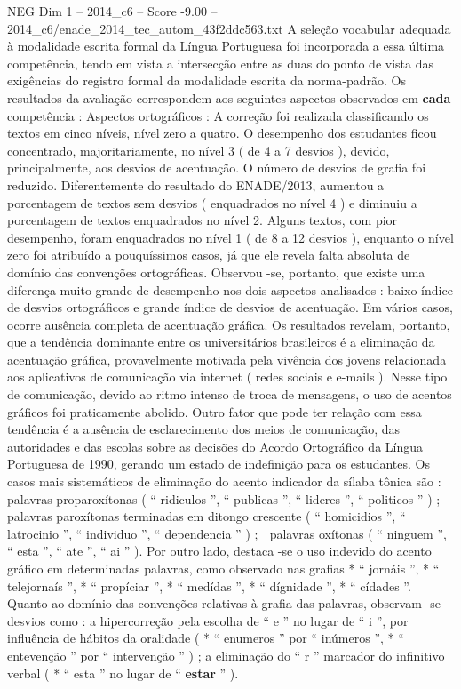 \begin{textsample}{NEG Dim 1 – 2014\_c6 – Score -9.00 – 2014\_c6/enade\_2014\_tec\_autom\_43f2ddc563.txt}
A seleção vocabular adequada à modalidade escrita formal da Língua Portuguesa foi incorporada a essa última competência, tendo em vista a intersecção entre as duas do ponto de vista das exigências do registro formal da modalidade escrita da norma-padrão.
Os resultados da avaliação correspondem aos seguintes aspectos observados em \textbf{cada} competência : Aspectos ortográficos : A correção foi realizada classificando os textos em cinco níveis, nível zero a quatro.
O desempenho dos estudantes ficou concentrado, majoritariamente, no nível 3 ( de 4 a 7 desvios ), devido, principalmente, aos desvios de acentuação.
O número de desvios de grafia foi reduzido.
Diferentemente do resultado do ENADE/2013, aumentou a porcentagem de textos sem desvios ( enquadrados no nível 4 ) e diminuiu a porcentagem de textos enquadrados no nível 2.
Alguns textos, com pior desempenho, foram enquadrados no nível 1 ( de 8 a 12 desvios ), enquanto o nível zero foi atribuído a pouquíssimos casos, já que ele revela falta absoluta de domínio das convenções ortográficas.
Observou -se, portanto, que existe uma diferença muito grande de desempenho nos dois aspectos analisados : baixo índice de desvios ortográficos e grande índice de desvios de acentuação.
Em vários casos, ocorre ausência completa de acentuação gráfica.
Os resultados revelam, portanto, que a tendência dominante entre os universitários brasileiros é a eliminação da acentuação gráfica, provavelmente motivada pela vivência dos jovens relacionada aos aplicativos de comunicação via internet ( redes sociais e e-mails ).
Nesse tipo de comunicação, devido ao ritmo intenso de troca de mensagens, o uso de acentos gráficos foi praticamente abolido.
Outro fator que pode ter relação com essa tendência é a ausência de esclarecimento dos meios de comunicação, das autoridades e das escolas sobre as decisões do Acordo Ortográfico da Língua Portuguesa de 1990, gerando um estado de indefinição para os estudantes.
Os casos mais sistemáticos de eliminação do acento indicador da sílaba tônica são :  palavras proparoxítonas ( “ ridiculos ”, “ publicas ”, “ lideres ”, “ politicos ” ) ;  palavras paroxítonas terminadas em ditongo crescente ( “ homicidios ”, “ latrocinio ”, “ individuo ”, “ dependencia ” ) ;  palavras oxítonas ( “ ninguem ”, “ esta ”, “ ate ”, “ ai ” ).
Por outro lado, destaca -se o uso indevido do acento gráfico em determinadas palavras, como observado nas grafias * “ jornáis ”, * “ telejornaís ”, * “ propíciar ”, * “ medídas ”, * “ dígnidade ”, * “ cídades ”.
Quanto ao domínio das convenções relativas à grafia das palavras, observam -se desvios como : a hipercorreção pela escolha de “ e ” no lugar de “ i ”, por influência de hábitos da oralidade ( * “ enumeros ” por “ inúmeros ”, * “ entevenção ” por “ intervenção ” ) ; a eliminação do “ r ” marcador do infinitivo verbal ( * “ esta ” no lugar de “ \textbf{estar} ” ).

\end{textsample}

